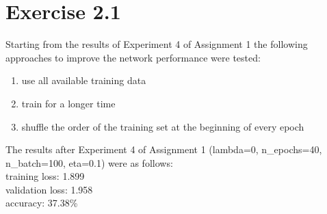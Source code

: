 \section{Exercise 2.1}
Starting from the results of Experiment 4 of Assignment 1 the following approaches to improve the network performance were tested:\\
\begin{enumerate}[label=(\roman*)]
    \item use all available training data
    \item train for a longer time
    \item shuffle the order of the training set at the beginning of every epoch
\end{enumerate}
The results after Experiment 4 of Assignment 1
(lambda=0, n\_epochs=40, n\_batch=100, eta=0.1) were as follows:\\
training loss: 1.899\\
validation loss: 1.958\\
accuracy: 37.38\%\\



